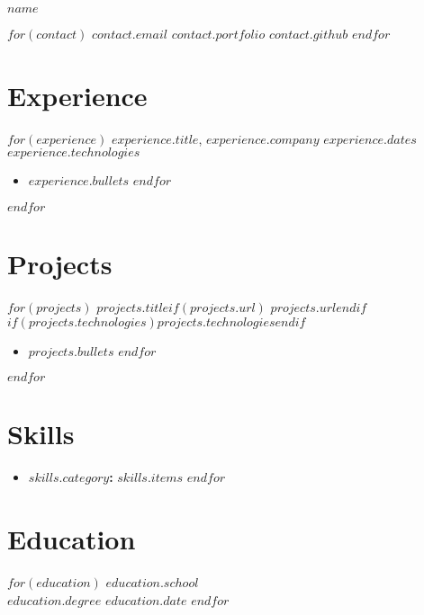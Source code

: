\documentclass[11pt,a4paper]{article}
\newcommand{\entrytitle}[1]{\vspace{0.5em}\textbf{#1}}
\begin{document}
\centerline{\Huge{$name$}}

\centerline{$for(contact)$
  $contact.email$ \textbar{} $contact.portfolio$ \textbar{} $contact.github$
$endfor$}

\section{Experience}
$for(experience)$
\entrytitle{$experience.title$}, $experience.company$ \hfill $experience.dates$ \\
\textit{$experience.technologies$}
\begin{itemize}
$for(experience.bullets)$
    \item $experience.bullets$
$endfor$
\end{itemize}
$endfor$

\section{Projects}
$for(projects)$
\entrytitle{$projects.title$}$if(projects.url)$ \hfill $projects.url$$endif$ \\
$if(projects.technologies)$\textit{$projects.technologies$}$endif$
\begin{itemize}
$for(projects.bullets)$
    \item $projects.bullets$
$endfor$
\end{itemize}
$endfor$

\section{Skills}
\begin{itemize}[label={},leftmargin=0em]
$for(skills)$
    \item \textbf{$skills.category$:} $skills.items$
$endfor$
\end{itemize}

\section{Education}
$for(education)$
\textbf{$education.school$} \\
$education.degree$ \hfill $education.date$
$endfor$
\end{document}
